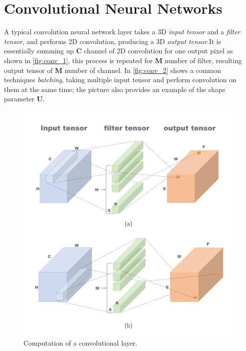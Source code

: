 \section{Convolutional Neural Networks}
A typical convolution neural network layer takes a 3D \textit{input tensor} and a \textit{filter tensor}, and performs 2D convolution, producing a 3D \textit{output tensor}.It is essentially summing up \textbf{C} channel of 2D convolution for one output pixel as shown in \autoref{fig:conv_1}, this process is repeated for \textbf{M} number of filter, resulting output tensor of \textbf{M} number of channel. 
In \autoref{fig:conv_2} shows a common techniques \textit{batching}, taking multiple input tensor and perform convolution on them at the same time; the picture also provides an example of the shape parameter \textbf{U}.
\begin{figure}[h]
    \centering
    \includegraphics[width=1\linewidth]{inc/3_low_numeric_convolution_neural_network/figure/convolution_1.png}
    \caption{Computation of a convolutional layer.}
    \label{fig:conv_1}
\end{figure}
